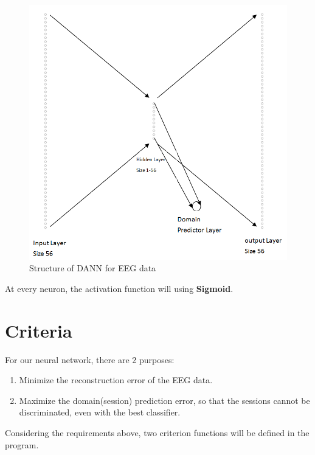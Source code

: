 \begin{figure}[htbp]
	\centering
	\includegraphics[width=15cm]{Figures/eegstructure.png}
	\caption[Structure of DANN for EEG data]{Structure of DANN for EEG data}
	\label{fig:eegstructure}
\end{figure}


At every neuron, the activation function will using \textbf{Sigmoid}.


\section{Criteria}
For our neural network, there are 2 purposes:
\begin{enumerate}
	\item Minimize the reconstruction error of the EEG data.
	\item Maximize the domain(session) prediction error, so that the sessions cannot be discriminated, even with the best classifier.
\end{enumerate}

Considering the requirements above, two criterion functions will be defined in the program. 

